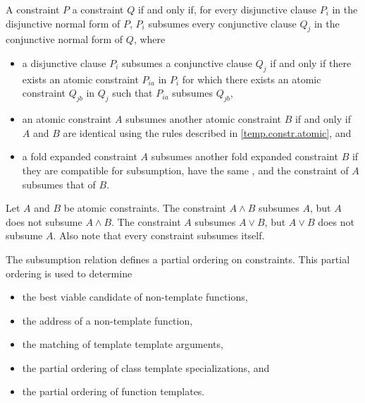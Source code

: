 \documentclass{wg21}
\begin{document}
\pnum
{}
A constraint $P$  a constraint $Q$
if and only if,
for every disjunctive clause $P_i$
in the disjunctive normal form of $P$, $P_i$ subsumes every conjunctive clause $Q_j$
in the conjunctive normal form of $Q$, where
\begin{itemize}
    \item
    a disjunctive clause $P_i$ subsumes a conjunctive clause $Q_j$ if and only
    if there exists an atomic constraint $P_{ia}$ in $P_i$ for which there exists
    an atomic constraint $Q_{jb}$ in $Q_j$ such that $P_{ia}$ subsumes $Q_{jb}$,

    \item an atomic constraint $A$ subsumes another atomic constraint
    $B$ if and only if $A$ and $B$ are identical using the
    rules described in \ref{temp.constr.atomic}, and

    \item a fold expanded constraint $A$ subsumes
    another fold expanded constraint $B$
    if they are compatible for subsumption,
    have the same , and
    the constraint of $A$ subsumes that of $B$.


\end{itemize}
%
\begin{example}
    Let $A$ and $B$ be atomic constraints.
    The constraint $A \land B$ subsumes $A$, but $A$ does not subsume $A \land B$.
    The constraint $A$ subsumes $A \lor B$, but $A \lor B$ does not subsume $A$.
    Also note that every constraint subsumes itself.
\end{example}

\pnum
\begin{note}
    The subsumption relation defines a partial ordering on constraints.
    This partial ordering is used to determine
    \begin{itemize}
        \item the best viable candidate of non-template functions,
        \item the address of a non-template function,
        \item the matching of template template arguments,
        \item the partial ordering of class template specializations, and
        \item the partial ordering of function templates.
    \end{itemize}
\end{note}
\end{document}

